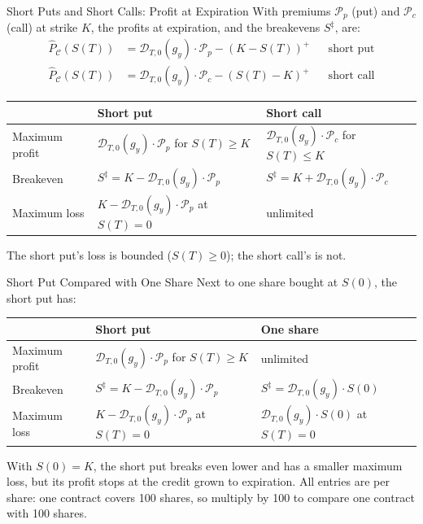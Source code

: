 \documentclass[aspectratio=169,11pt]{beamer}
\newcommand{\Cc}{\mathcal{C}}
\newcommand{\Dc}{\mathcal{D}}
\newcommand{\Pc}{\mathcal{P}}
\begin{document}
\begin{frame}{Short Puts and Short Calls: Profit at Expiration}
  With premiums $\Pc_{p}$ (put) and $\Pc_{c}$ (call) at strike $K$, the profits
  at expiration, and the breakevens $S^{\ddagger}$, are:
  \begin{align*}
    \hat{P}_{\Cc}(S(T)) &= \Dc_{T,0}(g_{y})\cdot\Pc_{p}-(K-S(T))^{+} && \text{short put}\\
    \hat{P}_{\Cc}(S(T)) &= \Dc_{T,0}(g_{y})\cdot\Pc_{c}-(S(T)-K)^{+} && \text{short call}
  \end{align*}
  \begin{center}\small
    \begin{tabular}{lll}
      \toprule
      & Short put & Short call \\
      \midrule
      Maximum profit & $\Dc_{T,0}(g_{y})\cdot\Pc_{p}$ for $S(T)\geq K$ & $\Dc_{T,0}(g_{y})\cdot\Pc_{c}$ for $S(T)\leq K$ \\
      Breakeven & $S^{\ddagger}=K-\Dc_{T,0}(g_{y})\cdot\Pc_{p}$ & $S^{\ddagger}=K+\Dc_{T,0}(g_{y})\cdot\Pc_{c}$ \\
      Maximum loss & $K-\Dc_{T,0}(g_{y})\cdot\Pc_{p}$ at $S(T)=0$ & unlimited \\
      \bottomrule
    \end{tabular}
  \end{center}
  The short put's loss is bounded ($S(T)\geq0$); the short call's is not.
\end{frame}

\begin{frame}{Short Put Compared with One Share}
  Next to one share bought at $S(0)$, the short put has:
  \begin{center}\small
    \begin{tabular}{lll}
      \toprule
      & Short put & One share \\
      \midrule
      Maximum profit & $\Dc_{T,0}(g_{y})\cdot\Pc_{p}$ for $S(T)\geq K$ & unlimited \\
      Breakeven & $S^{\ddagger}=K-\Dc_{T,0}(g_{y})\cdot\Pc_{p}$ & $S^{\ddagger}=\Dc_{T,0}(g_{y})\cdot S(0)$ \\
      Maximum loss & $K-\Dc_{T,0}(g_{y})\cdot\Pc_{p}$ at $S(T)=0$ & $\Dc_{T,0}(g_{y})\cdot S(0)$ at $S(T)=0$ \\
      \bottomrule
    \end{tabular}
  \end{center}
  With $S(0)=K$, the short put breaks even lower and has a smaller maximum loss,
  but its profit stops at the credit grown to expiration. All entries are per
  share: one contract covers 100 shares, so multiply by 100 to compare one
  contract with 100 shares.
\end{frame}
\end{document}
